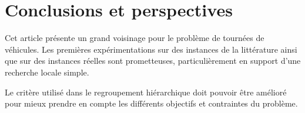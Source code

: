 \documentclass{roadef}
\begin{document}
\section{Conclusions et perspectives}

Cet article présente un grand voisinage pour le problème de tournées
de véhicules. Les premières expérimentations sur des instances de la
littérature ainsi que sur des instances réelles sont prometteuses,
particulièrement en support d'une recherche locale simple.

Le critère utilisé dans le regroupement hiérarchique doit pouvoir être
amélioré pour mieux prendre en compte les différents objectifs et
contraintes du problème.
\end{document}
